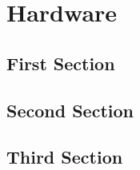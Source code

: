 \chapter{Hardware}
\thispagestyle{fancy}


\section{First Section}

\section{Second Section}

\section{Third Section}